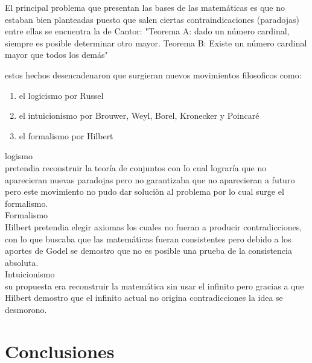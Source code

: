 \documentclass[11pt]{article}
\begin{document}
\begin{center}
El principal problema que presentan las bases de las matemáticas es que no estaban bien planteadas puesto que salen ciertas contraindicaciones (paradojas) entre ellas se encuentra la de Cantor: 
"Teorema A: dado un número cardinal, siempre es posible determinar otro mayor.
Teorema B: Existe un número cardinal mayor que todos los demás"

estos hechos desencadenaron que surgieran nuevos movimientos filosoficos como:


\begin{enumerate}
    \item el logicismo por Russel
    \item el intuicionismo por Brouwer, Weyl, Borel, Kronecker y Poincaré
    \item el formalismo por Hilbert
\end{enumerate}

logismo\\
pretendia reconstruir la teoría de conjuntos con lo cual lograría que no aparecieran nuevas paradojas pero no garantizaba que no aparecieran a futuro pero este movimiento no pudo dar soluciòn al problema por lo cual surge el formalismo.\\

Formalismo\\
Hilbert pretendia elegir axiomas los cuales no fueran a producir contradicciones, con lo que buscaba que las matemáticas fueran consistentes pero debido a los aportes de Godel se demostro que no es posible una prueba de la consistencia absoluta.\\

Intuicionismo\\
su propuesta era reconstruir la matemática sin usar el infinito pero gracias a que Hilbert demostro que el infinito actual no origina contradicciones la idea se desmorono.\\

\end{center}
\cite{fernandez1988crisis}

\section{Conclusiones}

\begin{center}
    
\end{center}
\end{document}
